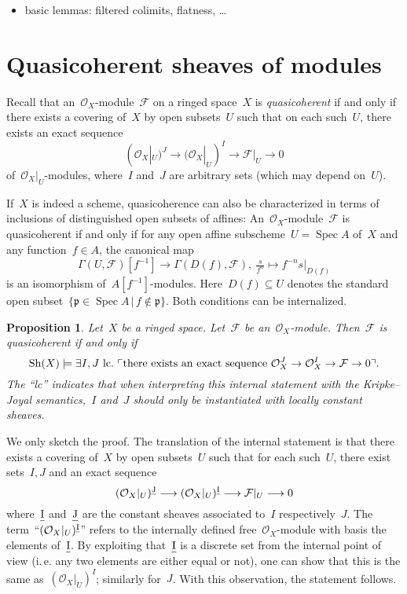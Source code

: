 \documentclass[10pt,reqno,a4paper]{amsbook}
\makeatletter
\theoremstyle{definition}
\theoremstyle{plain}
\newtheorem{prop}[defn]{Proposition}
\theoremstyle{remark}
\newcommand{\F}{\mathcal{F}}
\renewcommand{\O}{\mathcal{O}}
\newcommand{\ppp}{\mathfrak{p}}
\let\oldul\ul
\renewcommand{\ul}[1]{\text{\oldul{$#1$}}}
\newcommand{\Sh}{\mathrm{Sh}}
\DeclareMathOperator{\Spec}{Spec}
\newcommand{\?}{\,{:}\,}
\renewcommand{\_}{\mathpunct{.}\,}
\newcommand{\speak}[1]{\ulcorner\text{\textnormal{#1}}\urcorner}
\newcommand{\ie}{i.\,e.\@\xspace}
\renewenvironment{proof}[1][\proofname]{\par
  \pushQED{\qed}%
  \normalfont \topsep6\p@\@plus6\p@\relax
  \trivlist
  \item[\hskip\labelsep
        \itshape
    #1\@addpunct{.}]\ignorespaces
}{%
  \popQED\endtrivlist\@endpefalse
}
\makeatother
\begin{document}
\begin{itemize}
\item basic lemmas: filtered colimits, flatness, \ldots
\end{itemize}


\section{Quasicoherent sheaves of modules}
\label{sect:qcoh}

Recall that an~$\O_X$-module~$\F$ on a ringed space~$X$ is \emph{quasicoherent}
if and only if there exists a covering of~$X$ by open subsets~$U$ such that on
each such~$U$, there exists an exact sequence
\[ (\O_X|_U)^J \longrightarrow (\O_X|_U)^I \longrightarrow \F|_U \longrightarrow 0 \]
of~$\O_X|_U$-modules, where~$I$ and~$J$ are arbitrary sets (which may depend
on~$U$).

If~$X$ is indeed a scheme, quasicoherence can also be characterized in
terms of inclusions of distinguished open subsets of affines:
An~$\O_X$-module~$\F$ is quasicoherent if and only if for any open affine
subscheme~$U = \Spec A$ of~$X$ and any function~$f \in A$, the canonical map
\[ \Gamma(U,\F)[f^{-1}] \longrightarrow \Gamma(D(f),\F),\
  \tfrac{s}{f^n} \longmapsto f^{-n} s|_{D(f)} \]
is an isomorphism of~$A[f^{-1}]$-modules. Here~$D(f) \subseteq U$ denotes the
standard open subset~$\{ \ppp \in \Spec A \,|\, f \not\in \ppp \}$. Both
conditions can be internalized.

\begin{prop}Let~$X$ be a ringed space. Let~$\F$ be an~$\O_X$-module. Then~$\F$
is quasicoherent if and only if
\[ \Sh(X) \models \exists I,J\ \mathrm{lc}\_ \speak{there exists an
  exact sequence~$\O_X^J \to \O_X^I \to \F \to 0$}. \]
The ``\textnormal{lc}'' indicates that when interpreting this internal statement with the
Kripke--Joyal semantics,~$I$ and~$J$ should only be instantiated with
\emph{locally constant} sheaves.
\end{prop}
\begin{proof} We only sketch the proof.
The translation of the internal statement is that there exists a covering
of~$X$ by open subsets~$U$ such that for each such~$U$, there exist sets~$I,J$
and an exact sequence
\[ (\O_X|_U)^{\ul{J}} \longrightarrow (\O_X|_U)^{\ul{I}} \longrightarrow \F|_U
\longrightarrow 0 \]
where~$\ul{I}$ and~$\ul{J}$ are the constant sheaves associated to~$I$
respectively~$J$. The term~``$(\O_X|_U)^{\ul{I}}$'' refers to the internally
defined free~$\O_X$-module with basis the elements of~$\ul{I}$. By exploiting
that~$\ul{I}$ is a discrete set from the internal point of view (\ie any two
elements are either equal or not), one can show that this is the same
as~$(\O_X|_U)^I$; similarly for~$J$. With this observation, the statement
follows.
\end{proof}
\end{document}
